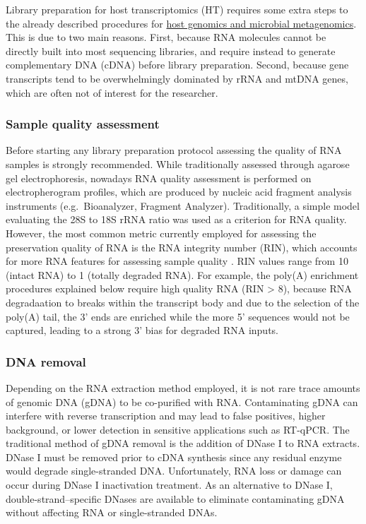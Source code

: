 \documentclass[
]{book}
\begin{document}
Library preparation for host transcriptomics (HT) requires some extra steps to the already described procedures for \protect\hyperlink{ux5cux23library-meta-genomics}{host genomics and microbial metagenomics}. This is due to two main reasons. First, because RNA molecules cannot be directly built into most sequencing libraries, and require instead to generate complementary DNA (cDNA) before library preparation. Second, because gene transcripts tend to be overwhelmingly dominated by rRNA and mtDNA genes, which are often not of interest for the researcher.

\hypertarget{rrna-sample-quality-assessment}{%
\subsubsection*{Sample quality assessment}\label{rrna-sample-quality-assessment}}

Before starting any library preparation protocol assessing the quality of RNA samples is strongly recommended. While traditionally assessed through agarose gel electrophoresis, nowadays RNA quality assessment is performed on electropherogram profiles, which are produced by nucleic acid fragment analysis instruments (e.g.~Bioanalyzer, Fragment Analyzer). Traditionally, a simple model evaluating the 28S to 18S rRNA ratio was used as a criterion for RNA quality. However, the most common metric currently employed for assessing the preservation quality of RNA is the RNA integrity number (RIN), which accounts for more RNA features for assessing sample quality \citep{Schroeder2006-dn}. RIN values range from 10 (intact RNA) to 1 (totally degraded RNA). For example, the poly(A) enrichment procedures explained below require high quality RNA (RIN \textgreater{} 8), because RNA degradaation to breaks within the transcript body and due to the selection of the poly(A) tail, the 3' ends are enriched while the more 5' sequences would not be captured, leading to a strong 3' bias for degraded RNA inputs.

\hypertarget{DNA-removal}{%
\subsubsection*{DNA removal}\label{DNA-removal}}

Depending on the RNA extraction method employed, it is not rare trace amounts of genomic DNA (gDNA) to be co-purified with RNA. Contaminating gDNA can interfere with reverse transcription and may lead to false positives, higher background, or lower detection in sensitive applications such as RT-qPCR. The traditional method of gDNA removal is the addition of DNase I to RNA extracts. DNase I must be removed prior to cDNA synthesis since any residual enzyme would degrade single-stranded DNA. Unfortunately, RNA loss or damage can occur during DNase I inactivation treatment. As an alternative to DNase I, double-strand--specific DNases are available to eliminate contaminating gDNA without affecting RNA or single-stranded DNAs.
\end{document}
